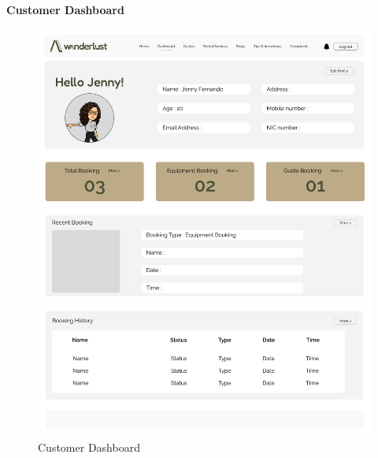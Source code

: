 \textbf{Customer Dashboard}\\
\begin{figure}[h!]
    \centering
    \includegraphics[width=1\textwidth]{Images/Wireframes/Customer Dashboard.png}
    \caption{Customer Dashboard}
\end{figure}
\clearpage

